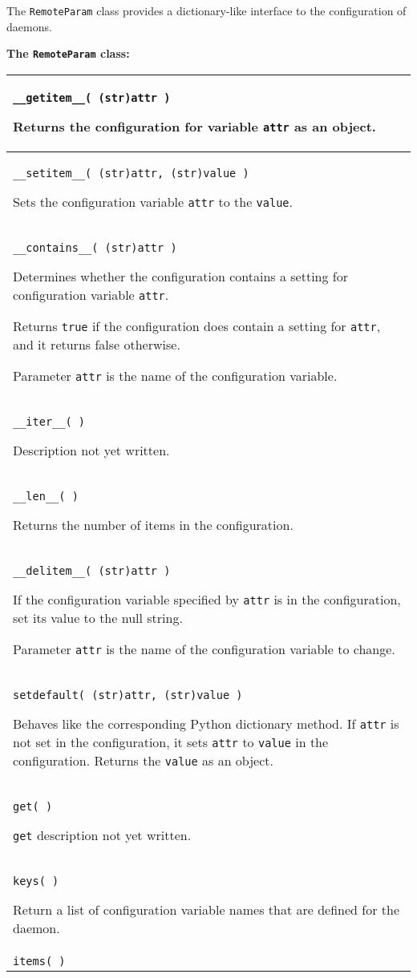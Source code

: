 The \texttt{RemoteParam} class provides a dictionary-like interface
to the configuration of daemons.

\textbf{The \texttt{RemoteParam} class:}
\begin{flushleft}
\begin{longtable}{|p{16cm}|} \hline
\texttt{\_\_getitem\_\_( (str)attr )}

Returns the configuration for variable \texttt{attr}
as an object.
\\ \hline
\texttt{\_\_setitem\_\_( (str)attr, (str)value )}

Sets the configuration variable \texttt{attr} to the \texttt{value}.
\\ \hline
\texttt{\_\_contains\_\_( (str)attr )}

Determines whether the configuration contains a setting for 
configuration variable \texttt{attr}.

Returns \texttt{true} if the configuration does contain a
setting for \texttt{attr}, and it returns false otherwise.

Parameter \texttt{attr} is the name of the configuration variable.
\\ \hline
\texttt{\_\_iter\_\_( )}

Description not yet written.
\\ \hline
\texttt{\_\_len\_\_( )}

Returns the number of items in the configuration.
\\ \hline
\texttt{\_\_delitem\_\_( (str)attr )}

If the configuration variable specified by \texttt{attr}
is in the configuration,
set its value to the null string.

Parameter \texttt{attr} is the name of the configuration variable to change.
\\ \hline
\texttt{setdefault( (str)attr, (str)value )}

Behaves like the corresponding Python dictionary method.
If \texttt{attr} is not set in the configuration,
it sets \texttt{attr} to \texttt{value} in the configuration.
Returns the \texttt{value} as an object.
\\ \hline
\texttt{get( )}

\texttt{get} description
not yet written.
\\ \hline
\texttt{keys( )}

Return a list of configuration variable names that are
defined for the daemon.
\\ \hline
\texttt{items( )}


\end{longtable}
\end{flushleft}
